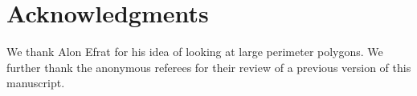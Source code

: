 \documentclass{llncs}
\begin{document}
\section{Acknowledgments}
\vspace{-8pt}
We thank Alon Efrat for his idea of looking at large perimeter polygons. We further thank the anonymous referees for their review of a previous version of this manuscript.

\vspace{-8pt}

	
\end{document}
